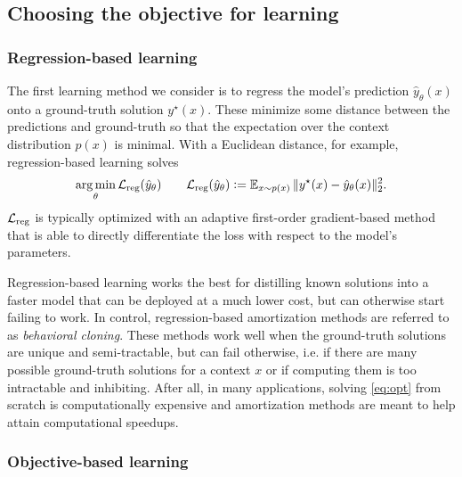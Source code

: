 \documentclass[twoside,11pt]{article}
\newcommand{\ie}{i.e.\xspace}
\begin{document}
\subsection{Choosing the objective for learning}
\subsubsection{Regression-based learning}
\label{sec:learning:reg}
The first learning method we consider is to regress the
model's prediction $\hat y_\theta(x)$ onto a
ground-truth solution $y^\star(x)$.
These minimize some distance between the predictions
and ground-truth so that the expectation over
the context distribution $p(x)$ is minimal.
With a Euclidean distance, for example,
regression-based learning solves
\begin{equation}
  \operatorname*{arg\,min}_\theta {\mathcal{L}}_{\rm reg}(\hat y_\theta) \qquad
  {\mathcal{L}}_{\rm reg}(\hat y_\theta) \vcentcolon=
  \operatorname{\mathbb{E}}_{x \sim p(x)} \|y^\star(x) - \hat y_\theta(x) \|_2^2.
\label{eq:reg-loss}
\end{equation}
${\mathcal{L}}_{\rm reg}$ is typically optimized with an adaptive first-order
gradient-based method that is able to directly differentiate
the loss with respect to the model's parameters.

Regression-based learning works the best for distilling
known solutions into a faster model that can be deployed
at a much lower cost, but can otherwise start failing to work.
In control, regression-based amortization
methods are referred to as \emph{behavioral cloning}.
These methods work well when the ground-truth solutions
are unique and semi-tractable, but can fail otherwise,
\ie if there are many possible ground-truth
solutions for a context $x$ or if computing them
is too intractable and inhibiting.
After all, in many applications, solving \cref{eq:opt}
from scratch is computationally expensive and
amortization methods are meant to help attain
computational speedups.

\subsubsection{Objective-based learning}
\label{sec:learning:grad}
\end{document}
